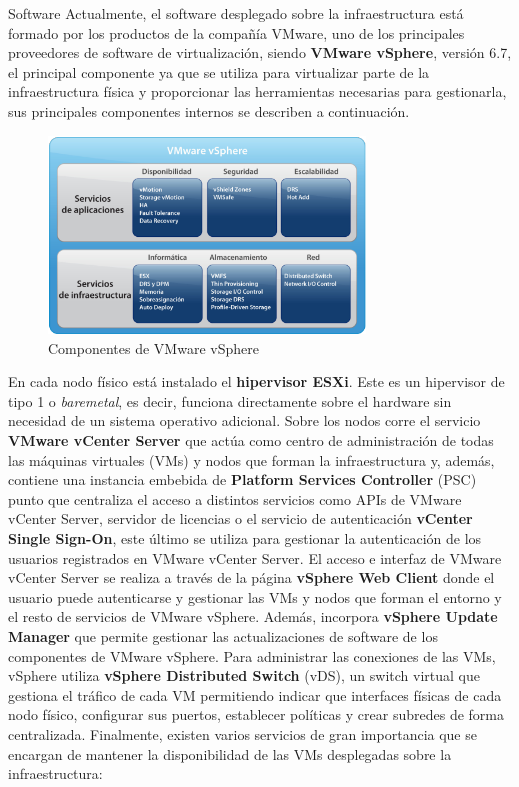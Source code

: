 \begin{section}{Software}
    \label{subsec:softwareinstalado}
    Actualmente, el software desplegado sobre la infraestructura está formado por los productos de la compañía VMware, uno de los principales proveedores de software de virtualización, siendo \textbf{VMware vSphere}, versión 6.7, el principal componente ya que se utiliza para virtualizar parte de la infraestructura física y proporcionar las herramientas necesarias para gestionarla, sus principales componentes internos se describen a continuación.
    \begin{figure}[h]
        \centering
        \includegraphics[width=0.75\textwidth]{imaxes/cap2recursos/contentVSphere}
        \caption{Componentes de VMware vSphere\cite{fotovSphere}}
        \label{fig:vSphere-components}
      \end{figure}
    En cada nodo físico está instalado el \textbf{hipervisor ESXi}. Este es un hipervisor de tipo 1 o \textit{baremetal}, es decir, funciona directamente sobre el hardware sin necesidad de un sistema operativo adicional. Sobre los nodos corre el servicio \textbf{VMware vCenter Server} que actúa como centro de administración de todas las máquinas virtuales (VMs) y nodos que forman la infraestructura y, además, contiene una instancia embebida de \textbf{Platform Services Controller} (PSC) punto que centraliza el acceso a distintos servicios como APIs de VMware vCenter Server, servidor de licencias o el servicio de autenticación \textbf{vCenter Single Sign-On}, este último se utiliza para gestionar la autenticación de los usuarios registrados en VMware vCenter Server. El acceso e interfaz de VMware vCenter Server se realiza a través de la página \textbf{vSphere Web Client} donde el usuario puede autenticarse y gestionar las VMs y nodos que forman el entorno y el resto de servicios de VMware vSphere. Además, incorpora \textbf{vSphere Update Manager} que permite gestionar las actualizaciones de software de los componentes de VMware vSphere. Para administrar las conexiones de las VMs, vSphere utiliza \textbf{vSphere Distributed Switch} (vDS), un switch virtual que gestiona el tráfico de cada VM permitiendo indicar que interfaces físicas de cada nodo físico, configurar sus puertos, establecer políticas y crear subredes de forma centralizada. Finalmente, existen varios servicios de gran importancia que se encargan de mantener la disponibilidad de las VMs desplegadas sobre la infraestructura:
    

\end{section}
